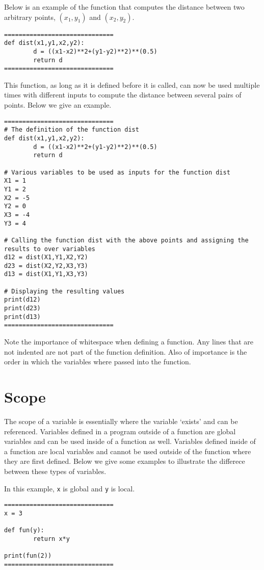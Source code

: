 \documentclass{ximera}
\begin{document}
Below is an example of the function that computes the distance between two arbitrary points, $(x_1,y_1)$ and $(x_2,y_2)$.

\begin{verbatim}
==============================
def dist(x1,y1,x2,y2):
        d = ((x1-x2)**2+(y1-y2)**2)**(0.5)
        return d
==============================
\end{verbatim}

This function, as long as it is defined before it is called, can now be used multiple times with different inputs to compute the distance between several pairs of points. Below we give an example.

\begin{verbatim}
==============================
# The definition of the function dist	
def dist(x1,y1,x2,y2):
        d = ((x1-x2)**2+(y1-y2)**2)**(0.5)
        return d

# Various variables to be used as inputs for the function dist
X1 = 1
Y1 = 2
X2 = -5
Y2 = 0
X3 = -4
Y3 = 4

# Calling the function dist with the above points and assigning the results to over variables
d12 = dist(X1,Y1,X2,Y2)
d23 = dist(X2,Y2,X3,Y3)
d13 = dist(X1,Y1,X3,Y3)
	
# Displaying the resulting values
print(d12)
print(d23)
print(d13)
==============================
\end{verbatim}

Note the importance of whitespace when defining a function. Any lines that are not indented are not part of the function definition. Also of importance is the order in which the variables where passed into the function.

\section{Scope}

The scope of a variable is essentially where the variable `exists' and can be referenced. Variables defined in a program outside of a function are global variables and can be used inside of a function as well. Variables defined inside of a function are local variables and cannot be used outside of the function where they are first defined. Below we give some examples to illustrate the differece between these types of variables.

In this example, \verb|x| is global and \verb|y| is local.

\begin{verbatim}
==============================
x = 3

def fun(y):
        return x*y

print(fun(2))
==============================
\end{verbatim}
\end{document}
